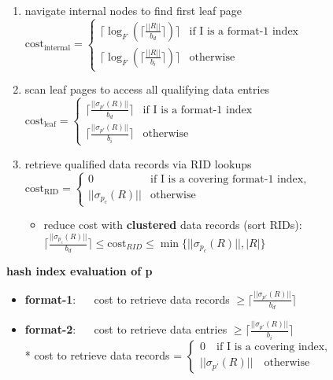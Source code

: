 \documentclass[8pt, landscape]{extarticle}
\begin{document}
\begin{multicols*}{4}
  \begin{enumerate}
    \item navigate internal nodes to find first leaf page
      \( {\displaystyle{ 
          \text{cost}_{\text{internal}}=
          \begin{cases}
            \lceil \log_F ( \lceil \frac{||R||}{b_d} \rceil )\rceil &\text{if $$I$$ is a format-1 index}\\
            \lceil \log_F ( \lceil 
            \frac{||R||}{b_i} \rceil )\rceil  &\text{otherwise}
          \end{cases}
      }} \) 
    \item scan leaf pages to access all qualifying data entries
      \( {\displaystyle{ 
          \text{cost}_{\text{leaf}}=
          \begin{cases}
            \lceil \frac{||\sigma_{p'}(R)||}{b_d} \rceil &\text{if $$I$$ is a format-1 index}\\
            \lceil \frac{||\sigma_{p'}(R)||}{b_i} \rceil &\text{otherwise}
          \end{cases}
      }} \) 
    \item retrieve qualified data records via RID lookups
      \( {\displaystyle{ 
          \text{cost}_{\text{RID}}=
          \begin{cases}
            0 &\text{if $$I$$ is a covering format-1 index,}\\
            ||\sigma_{p_c}(R)||  &\text{otherwise}
          \end{cases}
      }} \) 
      \begin{itemize}
        \item reduce cost with \textbf{clustered} data records (sort RIDs): 
          $\lceil\frac{||\sigma_{p_c}(R)||}{b_d}\rceil \leq \text{cost}_{RID} \leq \min\{||\sigma_{p_c}(R)||, |R|\}$
      \end{itemize}
  \end{enumerate}

  \textbf{hash index evaluation of p}

  \begin{itemize}
    \item \textbf{format-1}: $\quad$ cost to retrieve data records $ \geq \lceil\frac{||\sigma_{p'}(R)||}{b_d}\rceil $
    \item \textbf{format-2}: $\quad$ cost to retrieve data entries $ \geq \lceil\frac{||\sigma_{p'}(R)||}{b_i}\rceil $ 
      \\* cost to retrieve data records = $ \begin{cases} 0 \quad \text{if $$I$$ is a covering index,}\\
        ||\sigma_{p'}(R)||  \quad \text{otherwise}
      \end{cases} $
  \end{itemize}



\end{multicols*}
\end{document}
